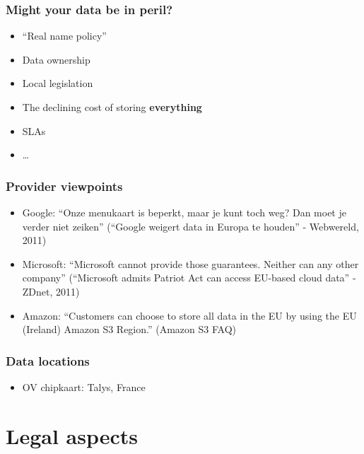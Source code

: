 \documentclass{beamer}
\begin{document}
\begin{frame}
    \frametitle{Might your data be in peril?}
    \begin{itemize}
      \item ``Real name policy''
      \item Data ownership
      \item Local legislation %
      \item The declining cost of storing \textbf{everything}
      \item SLAs
      \item \dots
    \end{itemize}
\end{frame}

\begin{frame}
    \frametitle{Provider viewpoints}
    \begin{itemize}
    \item Google: ``Onze menukaart is beperkt, maar je kunt toch weg? Dan moet
        je verder niet zeiken'' (``Google weigert data in Europa te houden'' -
        Webwereld, 2011)
    \item Microsoft: ``Microsoft cannot provide those guarantees. Neither can
        any other company'' (``Microsoft admits Patriot Act can access EU-based
        cloud data'' - ZDnet, 2011)
    \item Amazon: ``Customers can choose to store all data in the EU by using
        the EU (Ireland) Amazon S3 Region.'' (Amazon S3 FAQ)
    \end{itemize}
\end{frame}

\begin{frame}
    \frametitle{Data locations}
    \begin{itemize}
    \item OV chipkaart: Talys, France
    \end{itemize}
\end{frame}

\section{Legal aspects}
\end{document}
